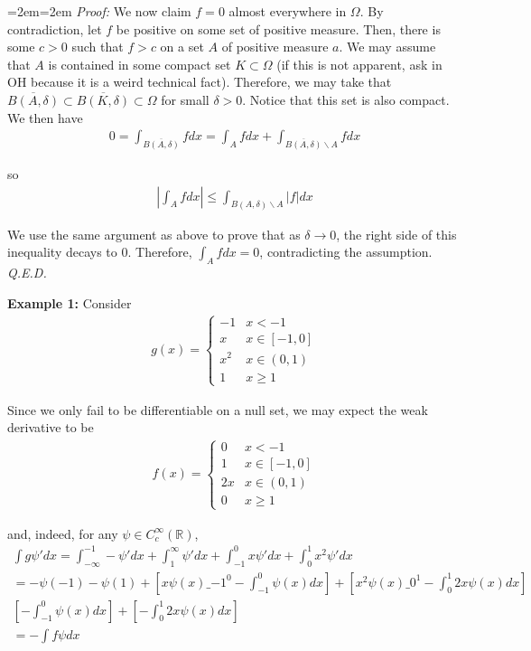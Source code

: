 \documentclass{article}
\newcommand{\R}{{\mathbb{R}}}
\newcommand{\cl}[1]{{\overline{#1}}}
\newcommand{\CC}{C_{c}^{\infty}}
\newenvironment{pf}{%
	\par%
	\medskip
	\leftskip=2em\rightskip=2em%
	\noindent\ignorespaces \textit{Proof:} \newline}{%
	\,\, \newline \textit{Q.E.D.}\par\medskip}
\begin{document}
\begin{pf}
	We now claim $f = 0$ almost everywhere in $\Omega$. By contradiction, let $f$ be positive on some set of positive measure. Then, there is some $c>0$ such that $f > c$ on a set $A$ of positive measure $a$. We may assume that $A$ is contained in some compact set $K \subset \Omega$ (if this is not apparent, ask in OH because it is a weird technical fact). Therefore, we may take that $\cl{B(A,\delta)} \subset \cl{B(K,\delta)} \subset \Omega$ for small $\delta>0$. Notice that this set is also compact. We then have 
	\begin{align*}
		0 = \int_{\cl{B(A,\delta)} } f dx = \int_{A} f dx + \int_{\cl{B(A,\delta)} \backslash A} f dx
	\end{align*} 
	
	so 
	\begin{align*}
		|\int_{A} f dx| \leq \int_{B(A,\delta) \backslash A} |f|dx 
	\end{align*}
	
	We use the same argument as above to prove that as $\delta \to 0$, the right side of this inequality decays to $0$. Therefore, $\int_{A} f dx = 0$, contradicting the assumption. 
	\end{pf}
	
	\vspace{0.25 cm}
	\textbf{Example 1:}
	Consider 
	\begin{align*}
		g(x) = \begin{cases}
			-1 & x < -1 \\
			x & x \in [-1,0] \\
			x^{2} & x \in (0,1) \\
			1 & x \geq 1
		\end{cases}
	\end{align*}
	
	Since we only fail to be differentiable on a null set, we may expect the weak derivative to be 
	\begin{align*}
		f(x) = \begin{cases}
			0 & x < -1 \\
			1 & x \in [-1,0] \\
			2x & x \in (0,1) \\
			0 & x \geq 1
			\end{cases}
	\end{align*}
	
	and, indeed, for any $\psi \in \CC(\R)$, 
	\begin{align*}
		\int g \psi' dx = \int_{-\infty}^{-1} -\psi' dx + \int_{1}^{\infty} \psi' dx + \int_{-1}^{0} x\psi' dx + \int_{0}^{1} x^{2} \psi' dx \\
		= -\psi(-1) - \psi(1) + [x\psi(x)\_{-1}^{0} - \int_{-1}^{0} \psi(x)dx] + [x^{2}\psi(x)\_{0}^{1} - \int_{0}^{1} 2x \psi(x)dx] \\ 
		[ - \int_{-1}^{0} \psi(x)dx] + [ - \int_{0}^{1} 2x \psi(x)dx]\\
		= -\int f \psi dx
	\end{align*}
	
\end{document}
